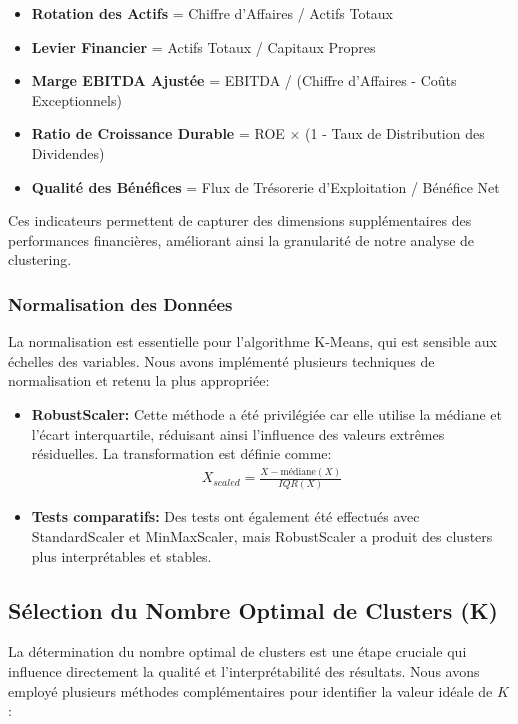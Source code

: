 \documentclass[12pt]{article}
\begin{document}
\begin{itemize}
    \item \textbf{Rotation des Actifs} = Chiffre d'Affaires / Actifs Totaux
    \item \textbf{Levier Financier} = Actifs Totaux / Capitaux Propres
    \item \textbf{Marge EBITDA Ajustée} = EBITDA / (Chiffre d'Affaires - Coûts Exceptionnels)
    \item \textbf{Ratio de Croissance Durable} = ROE $\times$ (1 - Taux de Distribution des Dividendes)
    \item \textbf{Qualité des Bénéfices} = Flux de Trésorerie d'Exploitation / Bénéfice Net
\end{itemize}

Ces indicateurs permettent de capturer des dimensions supplémentaires des performances financières, améliorant ainsi la granularité de notre analyse de clustering.

\subsubsection{Normalisation des Données}
La normalisation est essentielle pour l'algorithme K-Means, qui est sensible aux échelles des variables. Nous avons implémenté plusieurs techniques de normalisation et retenu la plus appropriée:

\begin{itemize}
    \item \textbf{RobustScaler:} Cette méthode a été privilégiée car elle utilise la médiane et l'écart interquartile, réduisant ainsi l'influence des valeurs extrêmes résiduelles. La transformation est définie comme:
    \begin{align}
    X_{scaled} = \frac{X - \text{médiane}(X)}{IQR(X)}
    \end{align}
    
    \item \textbf{Tests comparatifs:} Des tests ont également été effectués avec StandardScaler et MinMaxScaler, mais RobustScaler a produit des clusters plus interprétables et stables.
\end{itemize}

\subsection{Sélection du Nombre Optimal de Clusters (K)}
La détermination du nombre optimal de clusters est une étape cruciale qui influence directement la qualité et l'interprétabilité des résultats. Nous avons employé plusieurs méthodes complémentaires pour identifier la valeur idéale de $K$:
\end{document}
